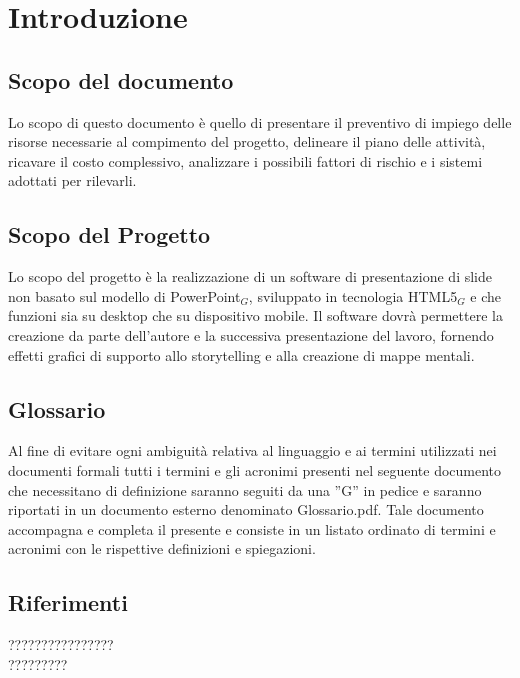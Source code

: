 \section{Introduzione}

\subsection{Scopo del documento}
Lo scopo di questo documento è quello di presentare il preventivo di impiego delle risorse necessarie al compimento del progetto, delineare il piano delle attività, ricavare il costo complessivo, analizzare i possibili fattori di rischio e i sistemi adottati per rilevarli.

\subsection{Scopo del Progetto}
Lo scopo del progetto è la realizzazione di un software di presentazione di slide non basato sul modello di PowerPoint$_{G}$, sviluppato in tecnologia HTML5$_{G}$ e che funzioni sia su desktop che su dispositivo mobile. Il software dovrà permettere la creazione da parte dell'autore e la successiva presentazione del lavoro, fornendo effetti grafici di supporto allo storytelling e alla creazione di mappe mentali. 

\subsection{Glossario}
Al fine di evitare ogni ambiguità relativa al linguaggio e ai termini utilizzati nei documenti formali tutti i termini e gli acronimi presenti nel seguente documento che necessitano di definizione saranno seguiti da una ”G” in pedice e saranno riportati in un documento esterno denominato Glossario.pdf. Tale documento accompagna e completa il presente e consiste in un listato ordinato di termini e acronimi con le rispettive definizioni e spiegazioni.

\subsection{Riferimenti}

????????????????\\
?????????\\
